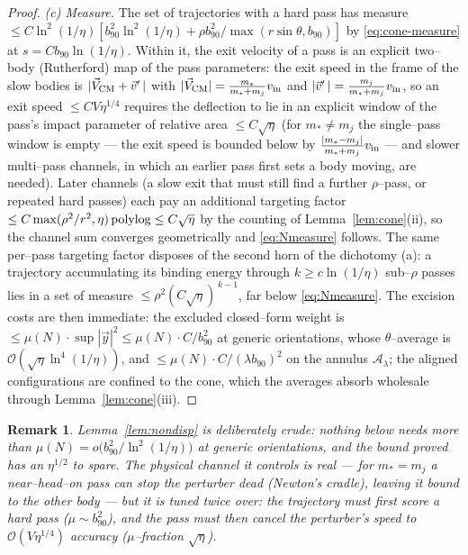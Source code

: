 \documentclass[11pt]{article}
\newcommand{\order}[1]{\mathcal O\!\left(#1\right)}
\newtheorem{remark}{Remark}
\begin{document}
\begin{proof}
\emph{(c) Measure.} The set of trajectories with a hard pass has measure
$\le C\ln^2(1/\eta)[b_{90}^2\ln^2(1/\eta)+\rho b_{90}^2/\max(r\sin\theta,b_{90})]$ by
\eqref{eq:cone-measure} at $s=Cb_{90}\ln(1/\eta)$. Within it, the exit velocity of a pass is an
explicit two--body (Rutherford) map of the pass parameters: the exit speed in the frame of the
slow bodies is $|\vec V_{\rm CM}+\vec v'\,|$ with $|\vec V_{\rm CM}|=\frac{m_*}{m_*+m_j}v_{\rm in}$
and $|\vec v'\,|=\frac{m_j}{m_*+m_j}v_{\rm in}$, so an exit speed $\le CV\eta^{1/4}$ requires the
deflection to lie in an explicit window of the pass's impact parameter of relative area
$\le C\sqrt\eta$ (for $m_*\ne m_j$ the single--pass window is empty --- the exit speed is bounded
below by $\frac{|m_*-m_j|}{m_*+m_j}v_{\rm in}$ --- and slower multi--pass channels, in which an
earlier pass first sets a body moving, are needed). Later channels (a slow exit that must still
find a further $\rho$--pass, or repeated hard passes) each pay an additional targeting factor
$\le C\max(\rho^2/r^2,\eta)\,{\rm polylog}\le C\sqrt\eta$ by the counting of
Lemma~\ref{lem:cone}(ii), so the channel sum converges geometrically and
\eqref{eq:Nmeasure} follows. The same per--pass targeting factor disposes of the second horn of
the dichotomy (a): a trajectory accumulating its binding energy through $k\ge c\ln(1/\eta)$
sub--$\rho$ passes lies in a set of measure $\le\rho^2(C\sqrt\eta)^{\,k-1}$, far below
\eqref{eq:Nmeasure}. The excision costs are then immediate: the excluded closed--form
weight is $\le\mu(N)\cdot\sup|\vec y|^2\le\mu(N)\cdot C/b_{90}^2$ at generic orientations, whose
$\theta$--average is $\order{\sqrt\eta\ln^4(1/\eta)}$, and
$\le\mu(N)\cdot C/(\lambda b_{90})^2$ on the annulus $\mathcal A_\lambda$; the aligned
configurations are confined to the cone, which the averages absorb wholesale through
Lemma~\ref{lem:cone}(iii).
\end{proof}

\begin{remark}
Lemma~\ref{lem:nondisp} is deliberately crude: nothing below needs more than
$\mu(N)=o\big(b_{90}^2/\ln^2(1/\eta)\big)$ at generic orientations, and the bound proved has an
$\eta^{1/2}$ to spare. The physical channel it controls is real --- for $m_*=m_j$ a
near--head--on pass can stop the perturber dead (Newton's cradle), leaving it bound to the other
body --- but it is tuned twice over: the trajectory must first score a hard pass
($\mu\sim b_{90}^2$), and the pass must then cancel the perturber's speed to $\order{V\eta^{1/4}}$
accuracy ($\mu$--fraction $\sqrt\eta$).
\end{remark}
\end{document}
